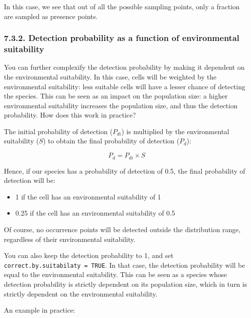 \documentclass[]{article}
\providecommand{\tightlist}{%
  \setlength{\itemsep}{0pt}\setlength{\parskip}{0pt}}
\begin{document}
In this case, we see that out of all the possible sampling points, only
a fraction are sampled as presence points.

\subsubsection{7.3.2. Detection probability as a function of
environmental
suitability}\label{detection-probability-as-a-function-of-environmental-suitability}

You can further complexify the detection probability by making it
dependent on the environmental suitability. In this case, cells will be
weighted by the environmental suitability: less suitable cells will have
a lesser chance of detecting the species. This can be seen as an impact
on the population size: a higher environmental suitability increases the
population size, and thus the detection probability. How does this work
in practice?

The initial probability of detection (\(P_{di}\)) is multiplied by the
environmental suitability (\(S\)) to obtain the final probability of
detection (\(P_d\)):

\[P_d = P_{di} \times S\]

Hence, if our species has a probability of detection of 0.5, the final
probability of detection will be:

\begin{itemize}
\tightlist
\item
  1 if the cell has an environmental suitability of 1
\item
  0.25 if the cell has an environmental suitability of 0.5
\end{itemize}

Of course, no occurrence points will be detected outside the
distribution range, regardless of their environmental suitability.

You can also keep the detection probability to 1, and set
\texttt{correct.by.suitabilaty\ =\ TRUE}. In that case, the detection
probability will be equal to the environmental suitability. This can be
seen as a species whose detection probability is strictly dependent on
its population size, which in turn is strictly dependent on the
environmental suitability.

An example in practice:
\end{document}
